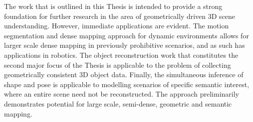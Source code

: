 The work that is outlined in this Thesis is intended to provide a strong foundation for further research in the area of 
geometrically driven 3D scene understanding. However, immediate applications are evident. The motion segmentation and 
dense mapping approach for dynamic environments allows for larger scale dense mapping in previously prohibitive scenarios, 
and as such has applications in robotics. The object reconstruction work that constitutes the second major focus of the Thesis 
is applicable to the problem of collecting geometrically consistent 3D object data. Finally, the simultaneous inference of 
shape and pose is applicable to modelling scenarios of specific semantic interest, where an entire scene need not be reconstructed. 
The approach preliminarily demonstrates potential for large scale, semi-dense, geometric and semantic mapping.